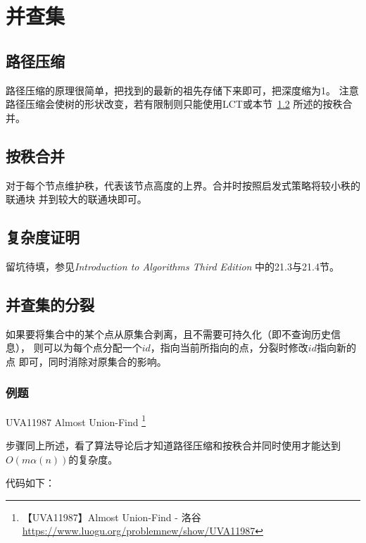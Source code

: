 \section{并查集}\label{DSU}
\subsection{路径压缩}
路径压缩的原理很简单，把找到的最新的祖先存储下来即可，把深度缩为1。
注意路径压缩会使树的形状改变，若有限制则只能使用LCT或本节~\ref{RankMerge}
所述的按秩合并。
\subsection{按秩合并}\label{RankMerge}
对于每个节点维护秩，代表该节点高度的上界。合并时按照启发式策略将较小秩的联通块
并到较大的联通块即可。
\subsection{复杂度证明}
留坑待填，参见\emph{Introduction to Algorithms Third Edition}\cite{ITA3}
中的21.3与21.4节。
\subsection{并查集的分裂}
如果要将集合中的某个点从原集合剥离，且不需要可持久化（即不查询历史信息），
则可以为每个点分配一个$id$，指向当前所指向的点，分裂时修改$id$指向新的点
即可，同时消除对原集合的影响。

\subsubsection{例题}

UVA11987 Almost Union-Find \footnote{
    【UVA11987】Almost Union-Find - 洛谷
    \url{https://www.luogu.org/problemnew/show/UVA11987}}

步骤同上所述，看了算法导论后才知道路径压缩和按秩合并同时使用才能达到
$O(m\alpha(n))$的复杂度。

代码如下：

